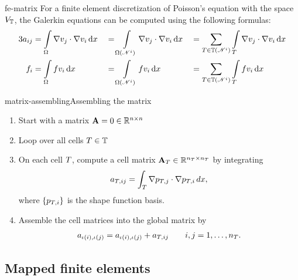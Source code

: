 \begin{Lemma}{fe-matrix}
  For a finite element discretization of Poisson's equation with the
  space $V_\mathbb T$, the Galerkin equations can be computed using the
  following formulas:
  \begin{alignat*}3
    a_{ij} &= \int\limits_\domain \nabla v_j \cdot \nabla v_i \dx
    &&= \int\limits_{\domain(\nodal^i)} \nabla v_j \cdot \nabla v_i \dx
    &&= \sum_{\cell\in\mesh(\nodal^i)}\int\limits_\cell \nabla v_j \cdot \nabla v_i \dx\\
    f_{i} &= \int\limits_\domain f v_i \dx
    &&= \int\limits_{\domain(\nodal^i)} f v_i \dx
    &&= \sum_{\cell\in\mesh(\nodal^i)}\int\limits_\cell f v_i \dx
  \end{alignat*}
\end{Lemma}

\begin{Algorithm*}{matrix-assembling}{Assembling the matrix}
  \begin{enumerate}
  \item Start with a matrix $\mathbf A = 0 \in \mathbb R^{n\times n}$
  \item Loop over all cells $T\in\mathbb T$
  \item On each cell $T$, compute a cell matrix
    $\mathbf A_T \in \mathbb R^{n_T\times n_T}$ by integrating
    \begin{gather}
      a_{T,ij} = \int_T \nabla p_{T,j}\cdot\nabla p_{T,i}\,dx,
    \end{gather}
    where $\{p_{T,i}\}$ is the shape function basis.
  \item Assemble the cell matrices into the global matrix by
    \begin{gather}
      a_{\iota(i),\iota(j)} = a_{\iota(i),\iota(j)} + a_{T,ij}
      \qquad i,j = 1,\dots,n_T.
    \end{gather}
  \end{enumerate}
\end{Algorithm*}

\subsection{Mapped finite elements}


